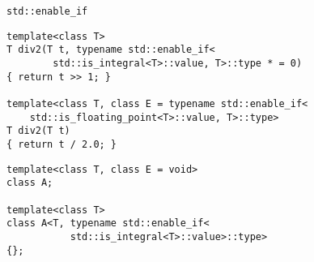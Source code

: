 \documentclass{beamer}
\begin{document}
\begin{frame}[fragile]{{\tt std::enable\_if}}
\begin{lstlisting}
template<class T>
T div2(T t, typename std::enable_if<
        std::is_integral<T>::value, T>::type * = 0)
{ return t >> 1; }

template<class T, class E = typename std::enable_if<
    std::is_floating_point<T>::value, T>::type>
T div2(T t) 
{ return t / 2.0; }
\end{lstlisting}

\begin{lstlisting}
template<class T, class E = void> 
class A; 
 
template<class T>
class A<T, typename std::enable_if<
           std::is_integral<T>::value>::type> 
{};
\end{lstlisting}
\end{frame}
\end{document}

